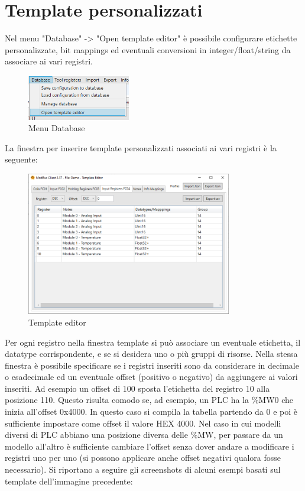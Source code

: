 
\chapter{Template personalizzati}
\label{template}

Nel menu "Database" -> "Open template editor" è possibile configurare etichette personalizzate, bit
mappings ed eventuali conversioni in integer/float/string da associare ai vari registri.

\begin{figure}[H]
    \centering
    \includegraphics[width=0.4\textwidth]{../Img/Menu_Database.PNG}
    \caption{Menu Database}
\end{figure}

La finestra per inserire template personalizzati associati ai vari registri è la seguente:

\begin{figure}[H]
\centering
\includegraphics[width=0.80\textwidth]{../Img/ModBus_Client_Template_00.PNG}
\caption{Template editor}
\end{figure}

Per ogni registro nella finestra template si può associare un eventuale etichetta, 
il datatype corrispondente,
e se si desidera uno o più gruppi di risorse.
Nella stessa finestra è possibile specificare se i registri inseriti
sono da considerare in decimale o esadecimale ed un eventuale offset (positivo o negativo)
da aggiungere ai valori inseriti.
Ad esempio un offset di 100 sposta l'etichetta del registro 10 alla
posizione 110. Questo risulta comodo se, ad esempio, un PLC ha la \%MW0 che inizia all'offset
0x4000. In questo caso si compila la tabella partendo da 0 e poi è sufficiente impostare come
offset il valore HEX 4000. Nel caso in cui modelli diversi di PLC abbiano una posizione
diversa delle \%MW, per passare da un modello all'altro è
sufficiente cambiare l'offset senza dover andare a modificare i registri 
uno per uno
(si possono applicare anche offset negativi
qualora fosse necessario).
Si riportano a seguire gli screenshots di alcuni esempi basati sul template
dell'immagine precedente:

